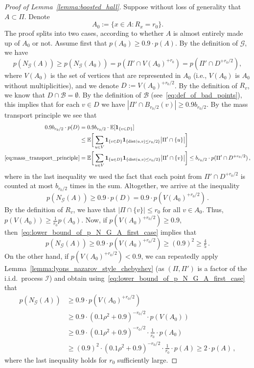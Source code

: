 \documentclass[11pt, reqno]{article}
\numberwithin{equation}{section}
\theoremstyle{definition}
\def\cI{\mathcal{I}}
\def\cG{\mathcal{G}}
\def\cB{\mathcal{B}}
\def\E{\mathbb{E}}
\newcommand{\1}{\mathds{1}}
\begin{document}
\begin{proof}[Proof of Lemma~\ref{lemma:boosted_hall}]
Suppose without loss of generality that $A\subset \Pi$.
Denote
\[ A_0 := \{ x \in A : R_x=r_0 \} .\]
The proof splits into two cases, according to whether $A$ is almost entirely made up of $A_0$ or not. 
Assume first that $p(A_0) \ge 0.9 \cdot p(A)$. 
By the definition of $\cG$, we have
\[
p(N_{\cG}(A)) \ge p(N_\cG(A_0)) = p(\Pi'\cap V(A_0)^{+r_0}) = p(\Pi'\cap D^{+r_0/2}),
\]
where $V(A_0)$ is the set of vertices that are represented in $A_0$ (i.e., $V(A_0)$ is $A_0$ without multiplicities), and we denote $D:=V(A_0)^{+r_0/2}$. By the definition of $R_v$, we know that $D\cap \cB = \emptyset$. By the definition of $\cB$ (see~\eqref{eq:def_of_bad_points}), this implies that for each $v\in D$ we have $|\Pi'\cap B_{r_0/2}(v)| \ge 0.9 b_{r_0/2}$. By the mass transport principle we see that
\begin{align*}
    0.9 b_{r_0/2} \cdot p(D) &= 0.9 b_{r_0/2} \cdot  \E[\mathbf{1}_{\{v\in D\}}] \\ & \le \E\bigg[ \sum_{u\in V} \mathbf{1}_{\{v\in D\}} \mathbf{1}_{\{\text{dist}(u,v) \le r_0/2\}} \big|\Pi'\cap \{u \} \big|\bigg] \\  \eqref{eq:mass_transport_principle} &= \E\bigg[ \sum_{u\in V} \mathbf{1}_{\{u\in D\}} \mathbf{1}_{\{\text{dist}(u,v) \le r_0/2\}} \big|\Pi'\cap \{v \} \big|\bigg] \le b_{r_0/2} \cdot p(\Pi'\cap D^{+r_0/2}) \, ,
\end{align*}
where in the last inequality we used the fact that each point from $\Pi'\cap D^{+r_0/2}$ is counted at most $b_{r_0/2}$ times in the sum. Altogether, we arrive at the inequality
\begin{equation}
    \label{eq:lower_bound_of_p_N_G_A_first_case}
    p(N_{\cG}(A)) \ge 0.9 \cdot p(D)  = 0.9 \cdot p(V(A_0)^{+r_0/2})\, .
\end{equation}
By the definition of $R_v$, we have that $|\Pi \cap \{v\}| \le r_0$ for all $v \in A_0$.
Thus, $p(V(A_0)) \ge \frac1{r_0}p(A_0)$.
Now, if $p(V(A_0)^{+r_0/2}) \ge 0.9$,  then~\eqref{eq:lower_bound_of_p_N_G_A_first_case} implies that 
\[
p(N_{\mathcal{G}}(A)) \ge 0.9 \cdot p(V(A_0)^{+r_0/2}) \ge (0.9)^2  \ge \tfrac45 \, . 
\]
On the other hand, if $p(V(A_0)^{+r_0/2}) <0.9$, we can repeatedly apply Lemma~\ref{lemma:lyons_nazarov_style_chebyshev} (as $(\Pi,\Pi')$ is a factor of the i.i.d.\ process $\cI$) and obtain using~\eqref{eq:lower_bound_of_p_N_G_A_first_case} that
\begin{align*}
    p(N_\cG(A))
    &\ge 0.9 \cdot p(V(A_0)^{+r_0/2}) \\
    &\ge 0.9 \cdot(0.1\rho^2 + 0.9)^{-r_0/2} \cdot p(V(A_0)) \\
    &\ge 0.9 \cdot(0.1\rho^2 + 0.9)^{-r_0/2} \cdot \tfrac1{r_0} \cdot p(A_0) \\
    &\ge (0.9)^2 \cdot (0.1\rho^2 + 0.9)^{-r_0/2} \cdot \tfrac1{r_0} \cdot p(A) \ge 2 \cdot p(A)\, ,
\end{align*}
where the last inequality holds for $r_0$ sufficiently large.


\end{proof}
\end{document}
